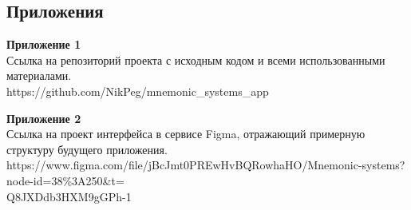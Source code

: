 \documentclass[draft]{article}
\newcommand\zz[1]{\par{\normalsize\strut #1} \hfill\ignorespaces}
\begin{document}
\newpage
\begin{center}
\section*{Приложения}
\end{center}
\zz{}\textbf{Приложение 1\\}
Ссылка на репозиторий проекта с исходным кодом и всеми использованными материалами.\\
https://github.com/NikPeg/mnemonic\_systems\_app\\
\zz{}\textbf{Приложение 2\\}
Ссылка на проект интерфейса в сервисе Figma, отражающий примерную структуру будущего приложения.\\
https://www.figma.com/file/jBcJmt0PREwHvBQRowhaHO/Mnemonic-systems?node-id=38\%3A250\&t=\\
Q8JXDdb3HXM9gGPh-1\\
\end{document}
